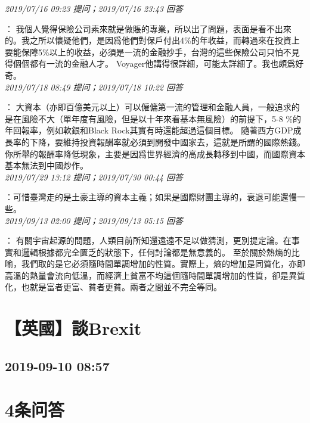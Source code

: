 \documentclass[twocolumn]{ctexart}
\begin{document}
\textit{\hfill\noindent\small 2019/07/16 09:23 提问；2019/07/16 23:43 回答}

：
我個人覺得保險公司素來就是做賬的專業，所以出了問題，表面是看不出來的。我之所以懷疑他們，是因爲他們對保戶付出4\%的年收益，而轉過來在投資上要能保障5\%以上的收益，必須是一流的金融抄手，台灣的這些保險公司只怕不見得個個都有一流的金融人才。
Voyager他講得很詳細，可能太詳細了。我也頗爲好奇。
\\

\textit{\hfill\noindent\small 2019/07/18 08:49 提问；2019/07/18 10:22 回答}

：
大資本（亦即百億美元以上）可以僱傭第一流的管理和金融人員，一般追求的是在風險不大（單年度有風險，但是以十年來看基本無風險）的前提下，5-8 \%的年回報率，例如軟銀和Black Rock其實有時還能超過這個目標。 
隨著西方GDP成長率的下降，要維持投資報酬率就必須到開發中國家去，這就是所謂的國際熱錢。你所舉的報酬率降低現象，主要是因爲世界經濟的高成長轉移到中國，而國際資本基本無法到中國炒作。
\\

\textit{\hfill\noindent\small 2019/07/29 13:12 提问；2019/07/30 00:44 回答}

：可惜臺灣走的是土豪主導的資本主義；如果是國際財團主導的，衰退可能還慢一些。
\\

\textit{\hfill\noindent\small 2019/09/13 02:00 提问；2019/09/13 05:15 回答}

：
有關宇宙起源的問題，人類目前所知還遠遠不足以做猜測，更別提定論。在事實和邏輯根據都完全匱乏的狀態下，任何討論都是無意義的。
至於關於熱熵的比喻，我們取的是它必須隨時間單調增加的性質。實際上，熵的增加是同質化，亦即高溫的熱量會流向低溫，而經濟上貧富不均這個隨時間單調增加的性質，卻是異質化，也就是富者更富、貧者更貧。兩者之間並不完全等同。
\\


\section{【英國】談Brexit}
\subsection{2019-09-10 08:57}


\section{4条问答}
\end{document}
